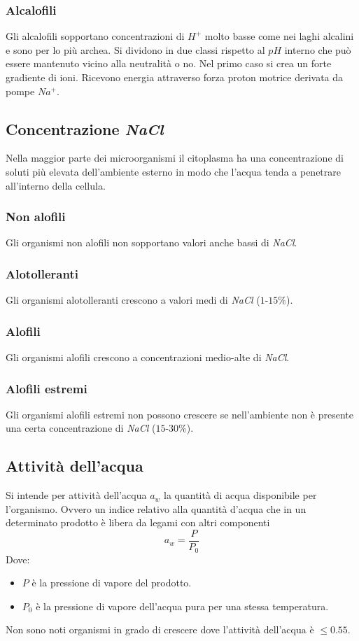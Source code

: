 		\subsubsection{Alcalofili}
		Gli alcalofili sopportano concentrazioni di \emph{$H^+$} molto basse come nei laghi alcalini e sono per lo pi\`u archea.
		Si dividono in due classi rispetto al $pH$ interno che pu\`o essere mantenuto vicino alla neutralit\`a o no.
		Nel primo caso si crea un forte gradiente di ioni.
		Ricevono energia attraverso forza proton motrice derivata da pompe \emph{$Na^+$}.

	\subsection{Concentrazione \emph{NaCl}}
	Nella maggior parte dei microorganismi il citoplasma ha una concentrazione di soluti pi\`u elevata dell'ambiente esterno in modo che l'acqua tenda a penetrare all'interno della cellula.

		\subsubsection{Non alofili}
		Gli organismi non alofili non sopportano valori anche bassi di \emph{NaCl}.
		
		\subsubsection{Alotolleranti}
		Gli organismi alotolleranti crescono a valori medi di \emph{NaCl} ($1$-$15\%$).

		\subsubsection{Alofili}
		Gli organismi alofili crescono a concentrazioni medio-alte di \emph{NaCl}.

		\subsubsection{Alofili estremi}
		Gli organismi alofili estremi non possono crescere se nell'ambiente non \`e presente una certa concentrazione di \emph{NaCl} ($15$-$30\%$).

	\subsection{Attivit\`a dell'acqua}
	Si intende per attivit\`a dell'acqua $a_w$ la quantit\`a di acqua disponibile per l'organismo.
	Ovvero un indice relativo alla quantit\`a d'acqua che in un determinato prodotto \`e libera da legami con altri componenti
	\[a_w=\dfrac{P}{P_0}\]
	Dove:
	\begin{multicols}{2}
		\begin{itemize}
			\item $P$ \`e la pressione di vapore del prodotto.
			\item $P_0$ \`e la pressione di vapore dell'acqua pura per una stessa temperatura.
		\end{itemize}
	\end{multicols}
	Non sono noti organismi in grado di crescere dove l'attivit\`a dell'acqua \`e $\le 0.55$.
		
